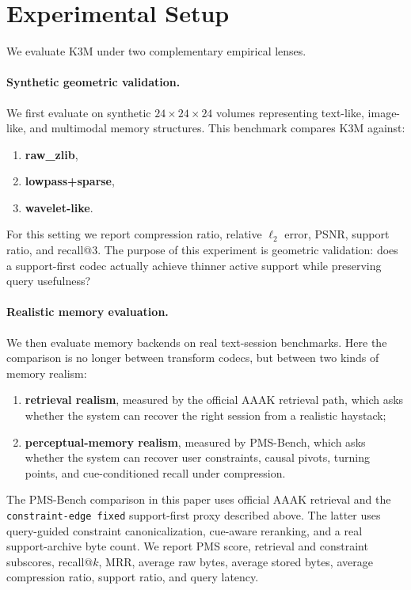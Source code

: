 \documentclass[11pt]{article}
\begin{document}
\section{Experimental Setup}
We evaluate K3M under two complementary empirical lenses.

\paragraph{Synthetic geometric validation.}
We first evaluate on synthetic $24\times24\times24$ volumes representing text-like, image-like, and multimodal memory structures. This benchmark compares K3M against:
\begin{enumerate}[leftmargin=1.5em]
\item \textbf{raw\_zlib},
\item \textbf{lowpass+sparse},
\item \textbf{wavelet-like}.
\end{enumerate}
For this setting we report compression ratio, relative $\ell_2$ error, PSNR, support ratio, and recall@3. The purpose of this experiment is geometric validation: does a support-first codec actually achieve thinner active support while preserving query usefulness?

\paragraph{Realistic memory evaluation.}
We then evaluate memory backends on real text-session benchmarks. Here the comparison is no longer between transform codecs, but between two kinds of memory realism:
\begin{enumerate}[leftmargin=1.5em]
\item \textbf{retrieval realism}, measured by the official AAAK retrieval path, which asks whether the system can recover the right session from a realistic haystack;
\item \textbf{perceptual-memory realism}, measured by PMS-Bench, which asks whether the system can recover user constraints, causal pivots, turning points, and cue-conditioned recall under compression.
\end{enumerate}

The PMS-Bench comparison in this paper uses official AAAK retrieval and the \texttt{constraint-edge fixed} support-first proxy described above. The latter uses query-guided constraint canonicalization, cue-aware reranking, and a real support-archive byte count. We report PMS score, retrieval and constraint subscores, recall@$k$, MRR, average raw bytes, average stored bytes, average compression ratio, support ratio, and query latency.
\end{document}
